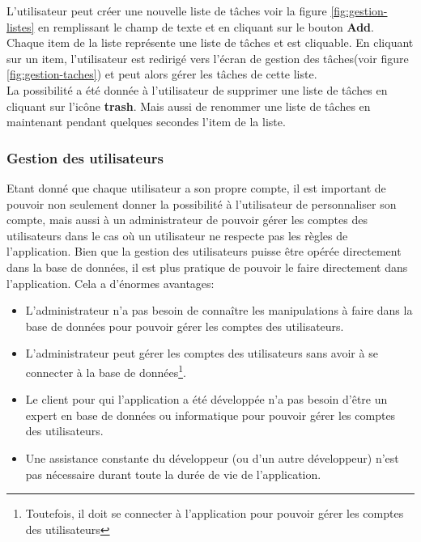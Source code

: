\documentclass[12pt]{article}
\begin{document}
        L'utilisateur peut créer une nouvelle liste de tâches voir la figure \ref{fig:gestion-listes} en remplissant
        le champ de texte et en cliquant sur le bouton \textbf{Add}.\\ Chaque item de la liste représente une liste de tâches
        et est cliquable. En cliquant sur un item, l'utilisateur est redirigé vers l'écran de gestion des tâches(voir figure \ref{fig:gestion-taches})
        et peut alors gérer les tâches de cette liste.\\
        La possibilité a été donnée à l'utilisateur de supprimer une liste de tâches en cliquant sur l'icône \textbf{trash}.
        Mais aussi de renommer une liste de tâches en maintenant pendant quelques secondes l'item de la liste.

        \subsubsection{Gestion des utilisateurs}\label{subsubsec:gestion-des-utilisateurs}
        Etant donné que chaque utilisateur a son propre compte, il est important de pouvoir non seulement donner la possibilité
        à l'utilisateur de personnaliser son compte, mais aussi à un administrateur de pouvoir gérer les comptes des utilisateurs
        dans le cas où un utilisateur ne respecte pas les règles de l'application. Bien que la gestion des utilisateurs
        puisse être opérée directement dans la base de données, il est plus pratique de pouvoir le faire directement dans l'application.
        Cela a d'énormes avantages:
        \begin{itemize}
            \item L'administrateur n'a pas besoin de connaître les manipulations à faire dans la base de données pour pouvoir gérer les comptes des utilisateurs.
            \item L'administrateur peut gérer les comptes des utilisateurs sans avoir à se connecter à la base de données\footnote{Toutefois, il doit se connecter à l'application pour pouvoir gérer les comptes des utilisateurs}.
            \item Le client pour qui l'application a été développée n'a pas besoin d'être un expert en base de données ou informatique pour pouvoir gérer les comptes des utilisateurs.
            \item Une assistance constante du développeur (ou d'un autre développeur) n'est pas nécessaire durant toute la durée de vie de l'application.
        \end{itemize}
\end{document}
